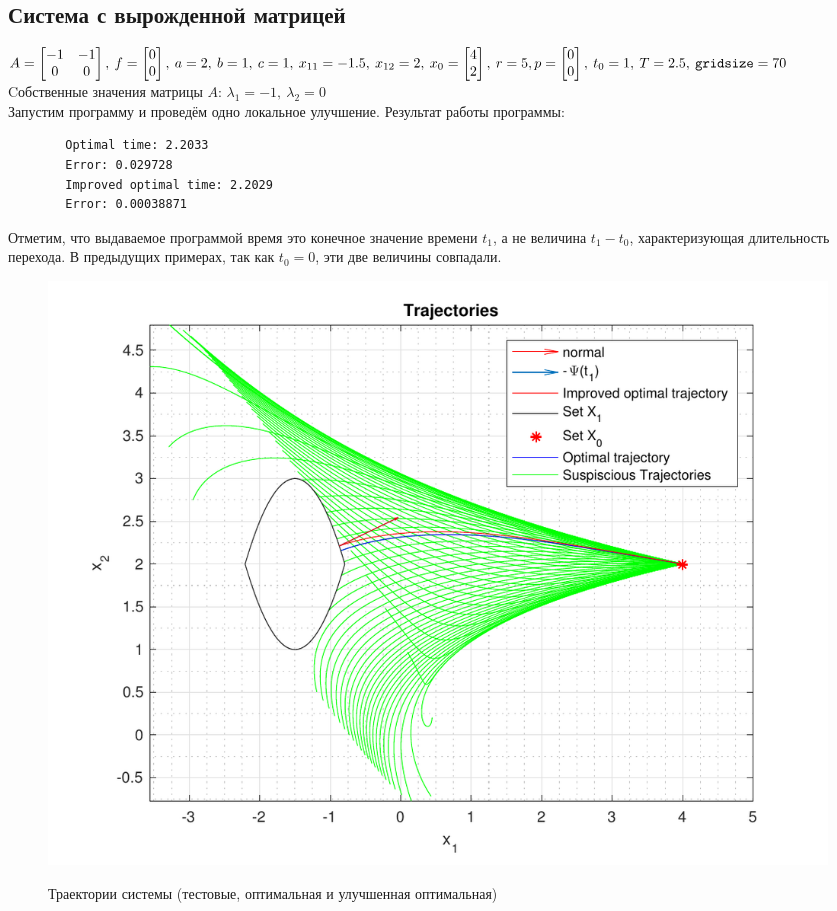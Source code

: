 \documentclass[11pt, oneside, final]{article}
\theoremstyle{break}
\numberwithin{equation}{section}
\theoremstyle{plain}
\theoremstyle{definition}
\begin{document}
    \subsection{Система с вырожденной матрицей}
    \(A = \begin{bmatrix} -1 & -1 \\ 0 & 0 \end{bmatrix},\:f = \begin{bmatrix} 0 \\ 0 \end{bmatrix},\: a = 2,\: b = 1,\: c = 1,\: x_{11} = -1.5,\: x_{12} = 2,\: x_0 =  \begin{bmatrix} 4 \\ 2 \end{bmatrix}, \: r = 5, \\ p = \begin{bmatrix} 0 \\ 0 \end{bmatrix}, \: t_0 = 1, \: T = 2.5, \: \mathtt{gridsize} = 70 \)\\
    Cобственные значения матрицы \(A\): \(\lambda_1 = -1, \: \lambda_2 = 0\)\\
    Запустим программу и проведём одно локальное улучшение. Результат работы программы:
    \begin{verbatim}
        Optimal time: 2.2033
        Error: 0.029728
        Improved optimal time: 2.2029
        Error: 0.00038871
    \end{verbatim}
    Отметим, что выдаваемое программой время это конечное значение времени \(t_1\), а не величина \(t_1 - t_0\), характеризующая длительность перехода. В предыдущих примерах, так как \(t_0 = 0\), эти две величины совпадали.
    \begin{figure}[H]
            \centering
            \includegraphics[width=\linewidth]{s4fig1}
            \label{pic:s4:1}
            \caption{Траектории системы (тестовые, оптимальная и улучшенная оптимальная)}
    \end{figure}
\end{document}
